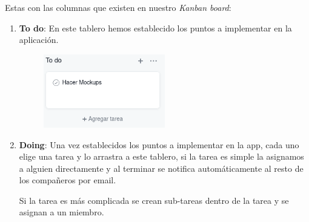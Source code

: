 \documentclass[12pt,a4paper]{article}
\begin{document}
Estas con las columnas que existen en nuestro \textit{Kanban board}:
\begin{enumerate}


\item \textbf{To do}: En este tablero hemos establecido los puntos a implementar en la aplicación.

\begin{figure}[h]
	\centering
	 \includegraphics[width=0.5\textwidth]{todo}
\end{figure}

\item \textbf{Doing}: Una vez establecidos los puntos a implementar en la app, cada uno elige una tarea y lo arrastra a este tablero, si la tarea es simple la asignamos a alguien directamente y al terminar se notifica automáticamente al resto de los compañeros por email. 

Si la tarea es más complicada se crean sub-tareas dentro de la tarea y se asignan a un miembro.


\end{enumerate}
\end{document}
